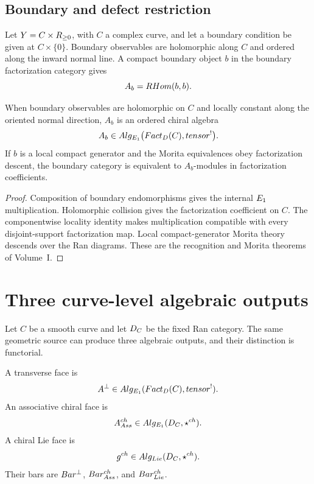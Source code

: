 \section{Boundary and defect restriction}
Let $Y=C\times R_{\ge0}$, with $C$ a complex curve, and let a boundary condition be given at $C\times\{0\}$. Boundary observables are holomorphic along $C$ and ordered along the inward normal line. A compact boundary object $b$ in the boundary factorization category gives
\[
 A_b=RHom(b,b).
\]

\begin{theorem}
When boundary observables are holomorphic on $C$ and locally constant along the oriented normal direction, $A_b$ is an ordered chiral algebra
\[
 A_b\in Alg_{E_1}\bigl(Fact_D(C),tensor^!\bigr).
\]
If $b$ is a local compact generator and the Morita equivalences obey factorization descent, the boundary category is equivalent to $A_b$-modules in factorization coefficients.
\end{theorem}
\begin{proof}
Composition of boundary endomorphisms gives the internal $E_1$ multiplication. Holomorphic collision gives the factorization coefficient on $C$. The componentwise locality identity makes multiplication compatible with every disjoint-support factorization map. Local compact-generator Morita theory descends over the Ran diagrams. These are the recognition and Morita theorems of Volume~I.
\end{proof}


\chapter{Three curve-level algebraic outputs}
Let $C$ be a smooth curve and let $D_C$ be the fixed Ran category.  The same geometric source can produce three algebraic outputs, and their distinction is functorial.

\begin{definition}
A transverse face is
\[
 A^\perp\in Alg_{E_1}(Fact_D(C),tensor^!).
\]
An associative chiral face is
\[
 A^{ch}_{Ass}\in Alg_{E_1}(D_C,\mathbin{\star^{ch}}).
\]
A chiral Lie face is
\[
 g^{ch}\in Alg_{Lie}(D_C,\mathbin{\star^{ch}}).
\]
Their bars are $Bar^{\perp}$, $Bar^{ch}_{Ass}$, and $Bar^{ch}_{Lie}$.
\end{definition}

